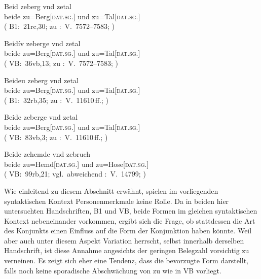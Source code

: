 \begin{exe}
\ex \label{ex:syntintvar2}
\begin{xlist}
	\ex \label{ex:syntintvar2_1}
		\gll Beid zeberg vnd zetal \\
			beide zu=Berg[\textsc{dat.sg.\MascI}] und zu=Tal[\textsc{dat.sg.\NeutI}] \\
		\trans {}
			(%
				B1:~21rc,30; zu
				\KC:~V.~7572--7583;
				\cite[220]{schroeder1895}%
			)

	\ex \label{ex:syntintvar2_3}
		\gll Beidív zeberge vnd zetal \\
			beide zu=Berg[\textsc{dat.sg.\MascI}] und zu=Tal[\textsc{dat.sg.\NeutI}] \\
		\trans {}
			(%
				VB:~36vb,13; zu
				\KC:~V.~7572--7583;
				\cite[220]{schroeder1895}%
			)
\end{xlist}

\ex \label{ex:syntintvar5}
\begin{xlist}
	\ex \label{ex:syntintvar2_2}
		\gll Beideu zeberg vnd zetal \\
			beide zu=Berg[\textsc{dat.sg.\MascI}] und zu=Tal[\textsc{dat.sg.\NeutI}] \\
		\trans {}
			(%
				B1:~32rb,35; zu
				\KC:~V.~11610\,ff.;
				\cite[293]{schroeder1895}%
			)

	\ex \label{ex:syntintvar2_4}
		\gll Beide zeberge vnd zetal \\
			beide zu=Berg[\textsc{dat.sg.\MascI}] und zu=Tal[\textsc{dat.sg.\NeutI}] \\
		\trans {}
			(%
				VB:~83vb,3; zu
				\KC:~V.~11610\,ff.;
				\cite[293]{schroeder1895}%
			)
\end{xlist}

\ex \label{ex:syntintvar4}
	\gll Beide zehemde vnd zebruch \\
		beide zu=Hemd[\textsc{dat.sg.\NeutI}] und
			zu=Hose[\textsc{dat.sg.\FemI}] \\
	\trans {}
		(%
			VB:~99rb,21; vgl.~abweichend
			\KC:~V.~14799;
			\cite[349]{schroeder1895}%
		)
\end{exe}

Wie einleitend zu diesem Abschnitt erwähnt, spielen im vorliegenden
syntaktischen Kontext Personenmerkmale keine Rolle. Da in beiden hier
untersuchten Handschriften, B1 und VB, beide Formen im gleichen syntaktischen
Kontext nebeneinander vorkommen, ergibt sich die Frage, ob stattdessen die Art
des Konjunkts einen Einfluss auf die Form der Konjunktion haben könnte. Weil
aber auch unter diesem Aspekt Variation herrscht, selbst innerhalb derselben
Handschrift, ist diese Annahme angesichts der geringen Belegzahl vorsichtig zu
verneinen. Es zeigt sich eher eine Tendenz, dass  die bevorzugte
Form darstellt, falls noch keine sporadische Abschwächung von  zu
 wie in VB vorliegt.

